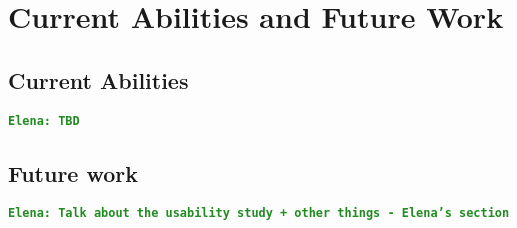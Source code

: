 \documentclass[12pt]{article}
\newcommand{\comment}[1]{{\bf \tt  {#1}}}
\newcommand{\emcomment}[1]{\textcolor{ForestGreen}{\comment{Elena: {#1}}}}
\begin{document}
		
\section{Current Abilities and Future Work}\label{sec:conclusion}
	\subsection{Current Abilities}\label{subsec:current-abilities}
	\emcomment{TBD}
	

	\subsection{Future work}\label{subsec:future}
	\emcomment{Talk about the usability study + other things - Elena's section}



\end{document}
